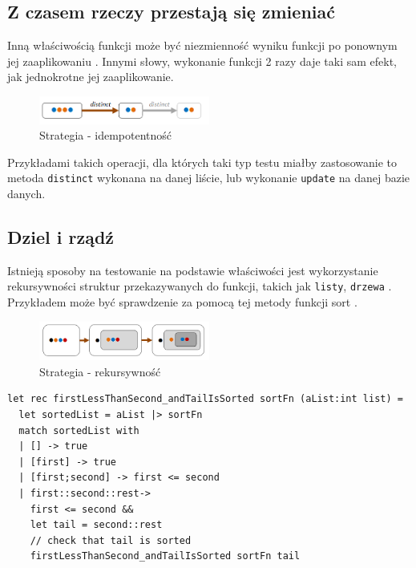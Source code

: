 \subsection{Z czasem rzeczy przestają się zmieniać}

Inną właściwością funkcji może być niezmienność wyniku funkcji po ponownym jej zaaplikowaniu . Innymi słowy, wykonanie funkcji 2 razy daje taki sam efekt, jak jednokrotne jej zaaplikowanie.

\begin{figure}
    \centering
    \includegraphics[width=0.5\textwidth]{images/property_idempotence.png}
    \caption{Strategia - idempotentność}
    \label{fig:independance_strategy}
\end{figure}

Przykładami takich operacji, dla których taki typ testu miałby zastosowanie to metoda \texttt{distinct} wykonana na danej liście, lub wykonanie \texttt{update} na danej bazie danych.

\subsection{Dziel i rządź}

Istnieją sposoby na testowanie na podstawie właściwości jest wykorzystanie rekursywności struktur przekazywanych do funkcji, takich jak \texttt{listy}, \texttt{drzewa} . Przykładem może być sprawdzenie za pomocą tej metody funkcji sort .

\begin{figure}
    \centering
    \includegraphics[width=0.5\textwidth]{images/property_induction.png}
    \caption{Strategia - rekursywność}
    \label{fig:recursive_strategy}
\end{figure}

\lstset{language=FSharp, basicstyle=\scriptsize}
\begin{lstlisting}[frame=single,caption={Test sortowania listy z wykorzystaniem strategii rekursywnej},label=kod:list_sort_rec]
let rec firstLessThanSecond_andTailIsSorted sortFn (aList:int list) =
  let sortedList = aList |> sortFn
  match sortedList with
  | [] -> true
  | [first] -> true
  | [first;second] -> first <= second
  | first::second::rest->
    first <= second &&
    let tail = second::rest
    // check that tail is sorted
    firstLessThanSecond_andTailIsSorted sortFn tail
\end{lstlisting}

